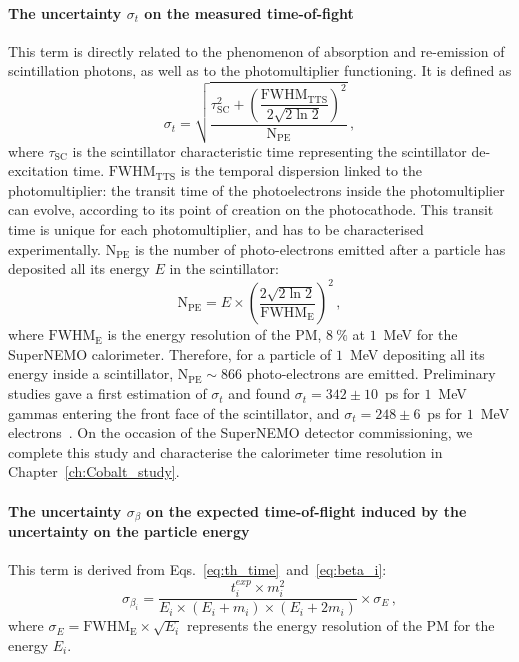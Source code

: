 \paragraph{The uncertainty $\sigma_{t}$ on the measured time-of-fight}
This term is directly related to the phenomenon of absorption and re-emission of scintillation photons, as well as to the photomultiplier functioning.
It is defined as
\begin{equation}
  \sigma_{t}=\sqrt{\dfrac{\tau_{\text{SC}}^{2}+\left(\dfrac{\text{FWHM}_{\text{TTS}}}{2\sqrt{2\ln{2}}}\right)^{2}}{\text{N}_\text{PE}}}\,,
  \label{eq:sigma_t}
\end{equation}
where $\tau_{\text{SC}}$ is the scintillator characteristic time representing the scintillator de-excitation time.
$\text{FWHM}_{\text{TTS}}$ is the temporal dispersion linked to the photomultiplier: the transit time of the photoelectrons inside the photomultiplier can evolve, according to its point of creation on the photocathode.
This transit time is unique for each photomultiplier, and has to be characterised experimentally.
$\text{N}_\text{PE}$ is the number of photo-electrons emitted after a particle has deposited all its energy $E$ in the scintillator:
\begin{equation}
  \text{N}_\text{PE} = E\times \left(\frac{2\sqrt{2\ln 2}}{\text{FWHM}_{\text{E}}}\right)^{2}\,,
\end{equation}
where $\text{FWHM}_{\text{E}}$ is the energy resolution of the PM, $8~\%$ at $1$~MeV for the SuperNEMO calorimeter.
Therefore, for a particle of $1$~MeV depositing all its energy inside a scintillator, $\text{N}_\text{PE}\sim 866$ photo-electrons are emitted.
Preliminary studies gave a first estimation of $\sigma_{t}$ and found $\sigma_{t}=342\pm 10$~ps for $1$~MeV gammas entering the front face of the scintillator, and $\sigma_{t}=248\pm 6$~ps for $1$~MeV electrons~\cite{HuberThesis}.
On the occasion of the SuperNEMO detector commissioning, we complete this study and characterise the calorimeter time resolution in Chapter~\ref{ch:Cobalt_study}.

\paragraph{The uncertainty $\sigma_{\beta}$ on the expected time-of-flight induced by the uncertainty on the particle energy}
This term is derived from Eqs.~\eqref{eq:th_time}~and~\eqref{eq:beta_i}:
\begin{equation}
  \sigma_{\beta_{i}} = \frac{t^{exp}_{i}\times m_{i}^{2}}{E_{i}\times (E_{i}+m_{i})\times (E_{i}+2m_{i})}\times \sigma_{E}\,,
  \label{eq:sigma_L}
\end{equation}
where $\sigma_{E}= \text{FWHM}_{\text{E}} \times \sqrt{E_{i}}$ represents the energy resolution of the PM for the energy $E_{i}$.

